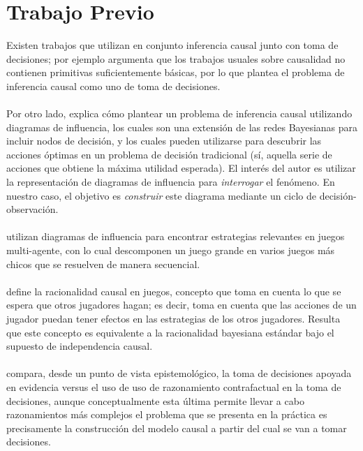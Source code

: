 \documentclass[11pt]{article}
\theoremstyle{plain}
\begin{document}
\section{Trabajo Previo}
Existen trabajos que utilizan en conjunto inferencia causal junto con toma de decisiones; por ejemplo \cite{heckerman1995decision} argumenta que los trabajos usuales sobre causalidad no contienen primitivas suficientemente básicas, por lo que plantea el problema de inferencia causal como uno de toma de decisiones.\\
\\
Por otro lado, \cite{dawid2002influence} explica cómo plantear un problema de inferencia causal utilizando diagramas de influencia, los cuales son una extensión de las redes Bayesianas para incluir nodos de decisión, y los cuales pueden utilizarse para descubrir las acciones óptimas en un problema de decisión tradicional (sí, aquella serie de acciones que obtiene la máxima utilidad esperada). El interés del autor es utilizar la representación de diagramas de influencia para \textit{interrogar} el fenómeno. En nuestro caso, el objetivo es \textit{construir} este diagrama mediante un ciclo de decisión-observación.\\
\\
\cite{koller2003multi} utilizan diagramas de influencia para encontrar estrategias relevantes en juegos multi-agente, con lo cual descomponen un juego grande en varios juegos más chicos que se resuelven de manera secuencial.\\
\\
\cite{board2006equivalence} define la racionalidad causal en juegos, concepto que toma en cuenta lo que se espera que otros jugadores hagan; es decir, toma en cuenta que las acciones de un jugador puedan tener efectos en las estrategias de los otros jugadores. Resulta que este concepto es equivalente a la racionalidad bayesiana estándar bajo el supuesto de independencia causal.\\
\\
\cite{soares2015toward} compara, desde un punto de vista epistemológico, la toma de decisiones apoyada en evidencia versus el uso de uso de razonamiento contrafactual en la toma de decisiones, aunque conceptualmente esta última permite llevar a cabo razonamientos más complejos el problema que se presenta en la práctica es precisamente la construcción del modelo causal a partir del cual se van a tomar decisiones.\\
\\
\end{document}
